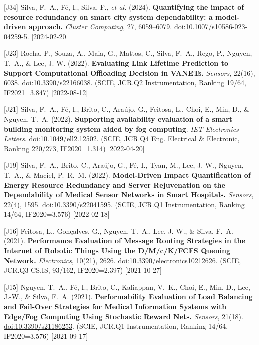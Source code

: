{\begin{pubenumerate}
\item {\color{blue}[J34]} Silva, F.\ A., F\'e, I., Silva, F., \textit{et al.} (2024). 
  \textbf{Quantifying the impact of resource redundancy on smart city system dependability: a model-driven approach.} 
  \textit{Cluster Computing}, 27, 6059--6079. 
  \href{https://doi.org/10.1007/s10586-023-04259-5}{doi:10.1007/s10586-023-04259-5}. [2024-02-20]

\item {\color{blue}[J23]} Rocha, P., Souza, A., Maia, G., Mattos, C., Silva, F.\ A., Rego, P., Nguyen, T.\ A., \& Lee, J.-W. (2022). \textbf{Evaluating Link Lifetime Prediction to Support Computational Offloading Decision in VANETs.} \textit{Sensors}, 22(16), 6038. \href{https://doi.org/10.3390/s22166038}{doi:10.3390/s22166038}. (SCIE, JCR.Q2 Instrumentation, Ranking 19/64, IF2021=3.847) [2022-08-12]

\item {\color{blue}[J21]} Silva, F.\ A., F\'e, I., Brito, C., Ara\'ujo, G., Feitosa, L., Choi, E., Min, D., \& Nguyen, T.\ A. (2022). \textbf{Supporting availability evaluation of a smart building monitoring system aided by fog computing}. \textit{IET Electronics Letters}. \href{https://doi.org/10.1049/ell2.12502}{doi:10.1049/ell2.12502}. (SCIE, JCR.Q4 Eng. Electrical \& Electronic, Ranking 220/273, IF2020=1.314) [2022-04-20]

\item {\color{blue}[J19]} Silva, F.\ A., Brito, C., Ara\'ujo, G., F\'e, I., Tyan, M., Lee, J.-W., Nguyen, T.\ A., \& Maciel, P.\ R.\ M. (2022). \textbf{Model-Driven Impact Quantification of Energy Resource Redundancy and Server Rejuvenation on the Dependability of Medical Sensor Networks in Smart Hospitals.} \textit{Sensors}, 22(4), 1595. \href{https://doi.org/10.3390/s22041595}{doi:10.3390/s22041595}. (SCIE, JCR.Q1 Instrumentation, Ranking 14/64, IF2020=3.576) [2022-02-18]

\item {\color{blue}[J16]} Feitosa, L., Gon\c{c}alves, G., Nguyen, T.\ A., Lee, J.-W., \& Silva, F.\ A. (2021). \textbf{Performance Evaluation of Message Routing Strategies in the Internet of Robotic Things Using the D/M/c/K/FCFS Queuing Network.} \textit{Electronics}, 10(21), 2626. \href{https://doi.org/10.3390/electronics10212626}{doi:10.3390/electronics10212626}. (SCIE, JCR.Q3 CS.IS, 93/162, IF2020=2.397) [2021-10-27]

\item {\color{blue}[J15]} Nguyen, T.\ A., F\'e, I., Brito, C., Kaliappan, V.\ K., Choi, E., Min, D., Lee, J.-W., \& Silva, F.\ A. (2021). \textbf{Performability Evaluation of Load Balancing and Fail-Over Strategies for Medical Information Systems with Edge/Fog Computing Using Stochastic Reward Nets.} \textit{Sensors}, 21(18). \href{https://doi.org/10.3390/s21186253}{doi:10.3390/s21186253}. (SCIE, JCR.Q1 Instrumentation, Ranking 14/64, IF2020=3.576) [2021-09-17]


\end{pubenumerate}}
